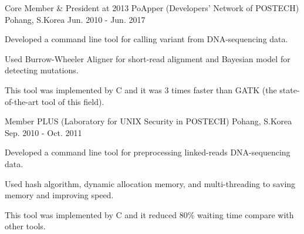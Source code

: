 

\begin{cventries}

  \cventry
    {Core Member \& President at 2013} %
    {PoApper (Developers' Network of POSTECH)} %
    {Pohang, S.Korea} %
    {Jun. 2010 - Jun. 2017} %
    {
      \begin{cvitems} %
        \item {Developed a command line tool for calling variant from DNA-sequencing data.}
        \item {Used Burrow-Wheeler Aligner for short-read alignment and Bayesian model for detecting mutations.}
        \item {This tool was implemented by C and it was 3 times faster than GATK (the state-of-the-art tool of this field).}
      \end{cvitems}
    }

  \cventry
    {Member} %
    {PLUS (Laboratory for UNIX Security in POSTECH)} %
    {Pohang, S.Korea} %
    {Sep. 2010 - Oct. 2011} %
    {
      \begin{cvitems} %
        \item {Developed a command line tool for preprocessing linked-reads DNA-sequencing data.}
        \item {Used hash algorithm, dynamic allocation memory, and multi-threading to saving memory and improving speed.}
        \item {This tool was implemented by C and it reduced 80\% waiting time compare with other tools.}
      \end{cvitems}
    }

\end{cventries}
